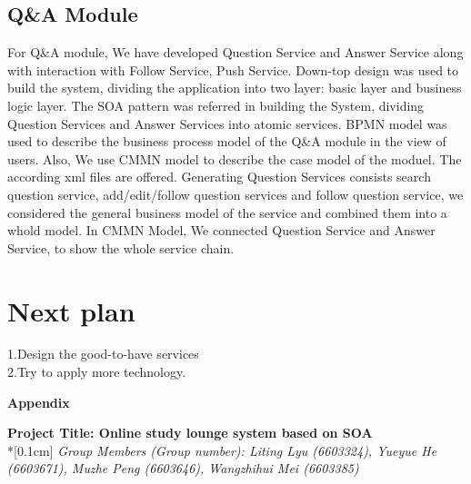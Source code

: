 \documentclass[runningheads]{llncs}
\begin{document}
\subsection*{Q\&A Module} %
\noindent
For Q\&A module, We have developed Question Service and Answer Service along with interaction with Follow Service, Push Service. Down-top design was used to build the system, dividing the application into two layer: basic layer and business logic layer. The SOA pattern was referred in building the System, dividing Question Services and Answer Services into atomic services. BPMN model was used to describe the business process model of the Q\&A module in the view of users. Also, We use CMMN model to describe the case model of the moduel. The according xml files are offered.
Generating Question Services consists search question service, add/edit/follow question services and follow question service, we considered the general business model of the service and combined them into a whold model. In CMMN Model, We connected Question Service and Answer Service, to show the whole service chain.

\section*{Next plan}
1.Design the good-to-have services
\\2.Try to apply more technology.

\clearpage
\begin{flushleft}
    \huge{\textbf{Appendix}}
\end{flushleft}
\begin{center}
    \Large{\textbf{Project Title: Online study lounge system based on SOA }} \\*[0.1cm]%
    \large{\emph{Group Members (Group number): Liting Lyu (6603324), Yueyue  He (6603671), Muzhe Peng (6603646), Wangzhihui Mei (6603385)}} %
\end{center}
    
\end{document}
